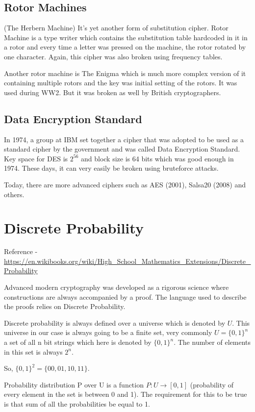 \documentclass[a4paper, 12pt]{article}
\begin{document}
\subsection{Rotor Machines}

(The Herbern Machine) It's yet another form of substitution cipher. Rotor Machine is a type writer which contains the substitution table hardcoded in it in a rotor and every time a letter was pressed on the machine, the rotor rotated by one character. Again, this cipher was also broken using frequency tables.

Another rotor machine is The Enigma which is much more complex version of it containing multiple rotors and the key was initial setting of the rotors. It was used during WW2. But it was broken as well by British cryptographers.

\subsection{Data Encryption Standard}

In 1974, a group at IBM set together a cipher that was adopted to be used as a standard cipher by the government and was called Data Encryption Standard. Key space for DES is $2^{56}$ and block size is 64 bits which was good enough in 1974. These days, it can very easily be broken using bruteforce attacks.

Today, there are more advanced ciphers such as AES (2001), Salsa20 (2008) and others.


\section{Discrete Probability}

Reference - \url{https://en.wikibooks.org/wiki/High_School_Mathematics_Extensions/Discrete_Probability}

Advanced modern cryptography was developed as a rigorous science where constructions are always accompanied by a proof. The language used to describe the proofs relies on Discrete Probability.

Discrete probability is always defined over a universe which is denoted by $U$. This universe in our case is always going to be a finite set, very commonly $U = \{0,1\}^n$ a set of all n bit strings which here is denoted by $\{0,1\}^n$. The number of elements in this set is always $2^n$.

So, $\{0,1\}^2 = \{00, 01, 10, 11\}$.

Probability distribution P over U is a function $P: U \rightarrow [0,1]$ (probability of every element in the set is between 0 and 1). The requirement for this to be true is that sum of all the probabilities be equal to 1.
\end{document}
